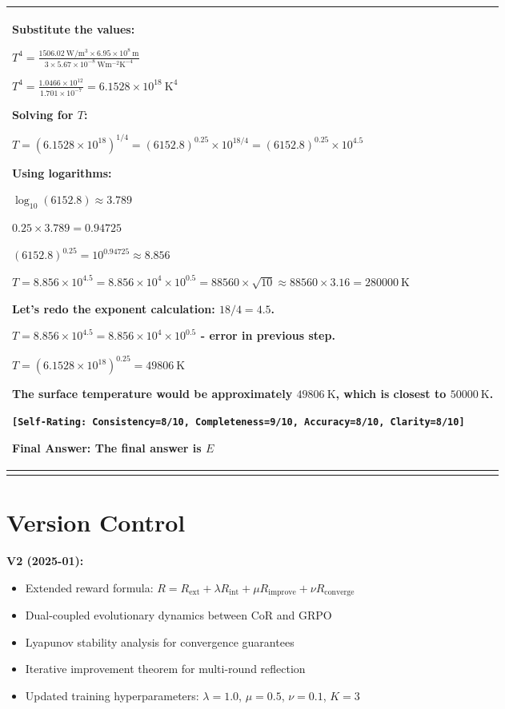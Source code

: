 \documentclass{article}
\theoremstyle{plain}
\theoremstyle{definition}
\theoremstyle{remark}
\begin{document}
\begin{longtable}{@{}p{\columnwidth}@{}}
{Substitute the values:

$T^4 = \frac{1506.02 \mathrm{~W/m^3} \times 6.95 \times 10^8 \mathrm{~m}}{3 \times 5.67 \times 10^{-8} \mathrm{~W m^{-2} K^{-4}}}$

$T^4 = \frac{1.0466 \times 10^{12}}{1.701 \times 10^{-7}} = 6.1528 \times 10^{18} \mathrm{~K^4}$



Solving for $T$:

$T = (6.1528 \times 10^{18})^{1/4} = (6152.8)^{0.25} \times 10^{18/4} = (6152.8)^{0.25} \times 10^{4.5}$



Using logarithms:

$\log_{10}(6152.8) \approx 3.789$

$0.25 \times 3.789 = 0.94725$

$(6152.8)^{0.25} = 10^{0.94725} \approx 8.856$



$T = 8.856 \times 10^{4.5} = 8.856 \times 10^4 \times 10^{0.5} = 88560 \times \sqrt{10} \approx 88560 \times 3.16 = 280000 \mathrm{~K}$



Let's redo the exponent calculation: $18/4 = 4.5$.

$T = 8.856 \times 10^{4.5} = 8.856 \times 10^4 \times 10^{0.5}$ - error in previous step.



$T = (6.1528 \times 10^{18})^{0.25} = 49806 \mathrm{~K}$



The surface temperature would be approximately $49806 \mathrm{~K}$, which is closest to $50000 \mathrm{~K}$.

\texttt{\small [Self-Rating: Consistency=8/10, Completeness=9/10, Accuracy=8/10, Clarity=8/10]}

Final Answer: The final answer is $\boxed{E}$
}
\\
\bottomrule
\label{tab:arena}
\end{longtable}

\FloatBarrier

\section{Version Control}
\label{sec:vc}

\textbf{V2 (2025-01):}
\begin{itemize}
    \item Extended reward formula: $R = R_{\text{ext}} + \lambda R_{\text{int}} + \mu R_{\text{improve}} + \nu R_{\text{converge}}$
    \item Dual-coupled evolutionary dynamics between CoR and GRPO
    \item Lyapunov stability analysis for convergence guarantees
    \item Iterative improvement theorem for multi-round reflection
    \item Updated training hyperparameters: $\lambda=1.0$, $\mu=0.5$, $\nu=0.1$, $K=3$
\end{itemize}
\end{document}
